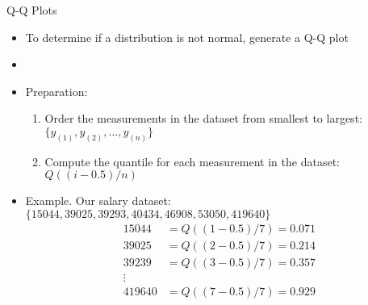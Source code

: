 \documentclass[xcolor=dvipsnames]{beamer}
\begin{document}
\begin{frame}{Q-Q Plots}
	\begin{itemize}
		\item To determine if a distribution is not normal, generate a Q-Q plot \pause
		\item[]
		\item Preparation: \pause
		\begin{enumerate}
			\item Order the measurements in the dataset from smallest to largest: $\{y_{(1)}, y_{(2)}, \hdots, y_{(n)} \}$ \pause
			\item Compute the quantile for each measurement in the dataset: $Q((i-0.5) /n)$ \pause
		\end{enumerate}
	\item Example. Our salary dataset: $\{15044, 39025, 39293, 40434, 46908, 53050, 419640\}$ \pause
	\begin{align*}
		15044 &= Q((1-0.5)/7) = 0.071 \\
		39025 &= Q((2-0.5)/7) = 0.214 \\
		39239 &= Q((3-0.5)/7) = 0.357 \\
		\vdots & \\
		419640 &= Q((7-0.5)/7) = 0.929
	\end{align*}
	\end{itemize}
\end{frame}
\end{document}
